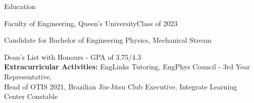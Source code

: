 \documentclass{resume} %
\begin{document}
\begin{rSection}{Education}

\begin{rSubsection}{Faculty of Engineering, Queen's University}{Class of 2023}{}{}
\item Candidate for Bachelor of Engineering Physics, Mechanical Stream
\item Dean's List with Honours - GPA of 3.75/4.3\\
\textbf{Extracurricular Activities:} EngLinks Tutoring, EngPhys Council - 3rd Year Representative,\\Head of OTIS 2021, Brazilian Jiu-Jitsu Club Executive, Integrate Learning Center Constable

\end{rSubsection}
\end{rSection}





\end{document}
